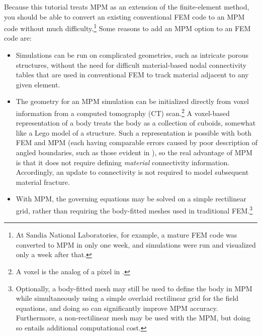 Because this tutorial treats MPM as an extension of the finite-element method, you should be able to convert an existing conventional FEM code to an MPM code without much difficulty.\footnote{At Sandia National Laboratories, for example, a mature FEM code was converted to MPM in only one week, and simulations were run and visualized only a week after that.} Some reasons to add an MPM option to an FEM code are:
\begin{itemize}
\item Simulations can be run on complicated geometries, such as intricate porous structures, without the need for difficult material-based nodal connectivity tables that are used in conventional FEM to track material adjacent to any given element. 
\item The geometry for an MPM simulation can be initialized directly from voxel information from a computed tomography (CT) scan.\footnote{A voxel is the \threeD analog of a pixel in \twoD.} A voxel-based representation of a body treats the body as a collection of cuboids, somewhat like a Lego model of a structure. Such a representation is possible with both FEM and MPM (each having comparable errors caused by poor description of angled boundaries, such as those evident in ), so the real advantage of MPM is that it does not require defining \emph{material} connectivity information. Accordingly, an update to connectivity is not required to model subsequent material fracture.
\item With MPM, the governing equations may be solved on a simple rectilinear grid, rather than requiring the body-fitted meshes used in traditional FEM.\footnote{Optionally, a body-fitted mesh may still be used to define the body in MPM while simultaneously using a simple overlaid rectilinear grid for the field equations, and doing so can significantly improve MPM accuracy.  Furthermore, a non-rectilinear mesh may be used with the MPM, but doing so entails additional computational cost.}

\end{itemize}
